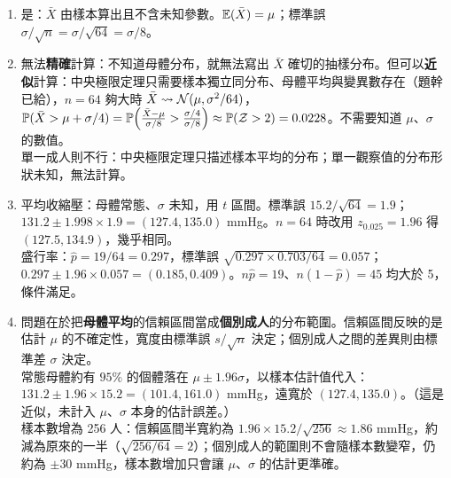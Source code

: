 
\renewcommand{\chapterlabel}{第 5--6 章\ 抽樣分布、中央極限定理與區間估計}
\newcommand{\handoutkind}{課堂練習\ 參考解答}

\newenvironment{answers}{\begin{enumerate}[leftmargin=*, label=\textbf{\arabic*.}, itemsep=6pt]}{\end{enumerate}}



\begin{answers}
    \item 是：$\bar{X}$ 由樣本算出且不含未知參數。$\mathbb{E}(\bar{X}) = \mu$；標準誤 $\sigma/\sqrt{n} = \sigma/\sqrt{64} = \sigma/8$。
    \item 無法\textbf{精確}計算：不知道母體分布，就無法寫出 $\bar{X}$ 確切的抽樣分布。但可以\textbf{近似}計算：中央極限定理只需要樣本獨立同分布、母體平均與變異數存在（題幹已給），$n = 64$ 夠大時 $\bar{X} \leadsto \mathcal{N}(\mu, \sigma^2/64)$，
          $\mathbb{P}(\bar{X} > \mu + \sigma/4) = \mathbb{P}\Big(\frac{\bar{X}-\mu}{\sigma/8} > \frac{\sigma/4}{\sigma/8}\Big) \approx \mathbb{P}(\mathcal{Z} > 2) = 0.0228$。不需要知道 $\mu$、$\sigma$ 的數值。\\
          單一成人則不行：中央極限定理只描述樣本平均的分布；單一觀察值的分布形狀未知，無法計算。
    \item 平均收縮壓：母體常態、$\sigma$ 未知，用 $t$ 區間。標準誤 $15.2/\sqrt{64} = 1.9$；$131.2 \pm 1.998 \times 1.9 = (127.4, 135.0)$ mmHg。$n = 64$ 時改用 $z_{0.025} = 1.96$ 得 $(127.5, 134.9)$，幾乎相同。\\
          盛行率：$\hat{p} = 19/64 = 0.297$，標準誤 $\sqrt{0.297 \times 0.703/64} = 0.057$；\\
          $0.297 \pm 1.96 \times 0.057 = (0.185, 0.409)$。$n\hat{p} = 19$、$n(1-\hat{p}) = 45$ 均大於 5，條件滿足。
    \item 問題在於把\textbf{母體平均}的信賴區間當成\textbf{個別成人}的分布範圍。信賴區間反映的是估計 $\mu$ 的不確定性，寬度由標準誤 $s/\sqrt{n}$ 決定；個別成人之間的差異則由標準差 $\sigma$ 決定。\\
          常態母體約有 $95\%$ 的個體落在 $\mu \pm 1.96\sigma$，以樣本估計值代入：$131.2 \pm 1.96 \times 15.2 = (101.4, 161.0)$ mmHg，遠寬於 $(127.4, 135.0)$。（這是近似，未計入 $\mu$、$\sigma$ 本身的估計誤差。）\\
          樣本數增為 256 人：信賴區間半寬約為 $1.96 \times 15.2/\sqrt{256} \approx 1.86$ mmHg，約減為原來的一半（$\sqrt{256/64} = 2$）；個別成人的範圍則不會隨樣本數變窄，仍約為 $\pm 30$ mmHg，樣本數增加只會讓 $\mu$、$\sigma$ 的估計更準確。
\end{answers}
\newpage

